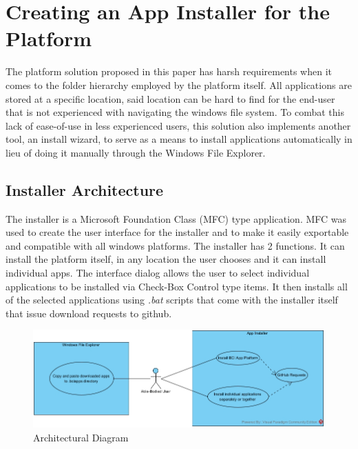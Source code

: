 
\chapter{Creating an App Installer for the Platform}\label{cap:installer}
The platform solution proposed in this paper has harsh requirements when it comes to the folder hierarchy employed by the platform itself. All applications are stored at a specific location, said location can be hard to find for the end-user that is not experienced with navigating the windows file system. To combat this lack of ease-of-use in less experienced users, this solution also implements another tool, an install wizard, to serve as a means to install applications automatically in lieu of doing it manually through the Windows File Explorer.


\section{Installer Architecture}
The installer is a Microsoft Foundation Class (MFC) type application. MFC was used to create the user interface for the installer and to make it easily exportable and compatible with all windows platforms. The installer has 2 functions. It can install the platform itself, in any location the user chooses and it can install individual apps. The interface dialog allows the user to select individual applications to be installed via Check-Box Control type items. It then installs all of the selected applications using \textit{.bat} scripts that come with the installer itself that issue download requests to github.

\begin{figure}[H]
  \centering
  \includegraphics[width=1\textwidth]{Diagrams/Installer Use Case.jpg}
  \caption{Architectural Diagram}
\end{figure}



